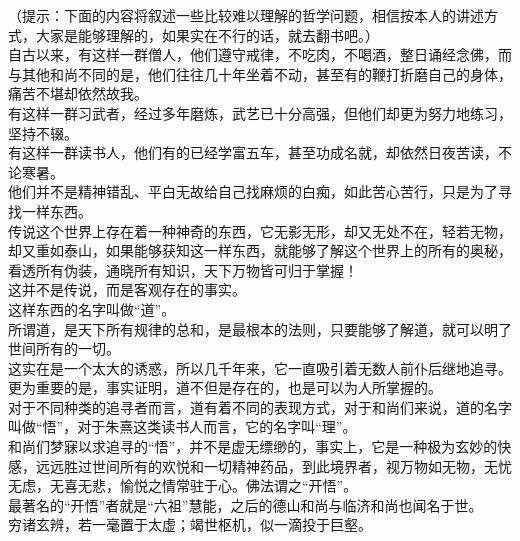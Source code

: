 \begin{multicols}{\theparacolNo}
（提示：下面的内容将叙述一些比较难以理解的哲学问题，相信按本人的讲述方式，大家是能够理解的，如果实在不行的话，就去翻书吧。）\\

自古以来，有这样一群僧人，他们遵守戒律，不吃肉，不喝酒，整日诵经念佛，而与其他和尚不同的是，他们往往几十年坐着不动，甚至有的鞭打折磨自己的身体，痛苦不堪却依然故我。\\

有这样一群习武者，经过多年磨炼，武艺已十分高强，但他们却更为努力地练习，坚持不辍。\\

有这样一群读书人，他们有的已经学富五车，甚至功成名就，却依然日夜苦读，不论寒暑。\\

他们并不是精神错乱、平白无故给自己找麻烦的白痴，如此苦心苦行，只是为了寻找一样东西。\\

传说这个世界上存在着一种神奇的东西，它无影无形，却又无处不在，轻若无物，却又重如泰山，如果能够获知这一样东西，就能够了解这个世界上的所有的奥秘，看透所有伪装，通晓所有知识，天下万物皆可归于掌握！\\

这并不是传说，而是客观存在的事实。\\

这样东西的名字叫做“道”。\\

所谓道，是天下所有规律的总和，是最根本的法则，只要能够了解道，就可以明了世间所有的一切。\\

这实在是一个太大的诱惑，所以几千年来，它一直吸引着无数人前仆后继地追寻。更为重要的是，事实证明，道不但是存在的，也是可以为人所掌握的。\\

对于不同种类的追寻者而言，道有着不同的表现方式，对于和尚们来说，道的名字叫做“悟”，对于朱熹这类读书人而言，它的名字叫“理”。\\

和尚们梦寐以求追寻的“悟”，并不是虚无缥缈的，事实上，它是一种极为玄妙的快感，远远胜过世间所有的欢悦和一切精神药品，到此境界者，视万物如无物，无忧无虑，无喜无悲，愉悦之情常驻于心。佛法谓之“开悟”。\\

最著名的“开悟”者就是“六祖”慧能，之后的德山和尚与临济和尚也闻名于世。\\

穷诸玄辨，若一毫置于太虚；竭世枢机，似一滴投于巨壑。\\


\end{multicols}
